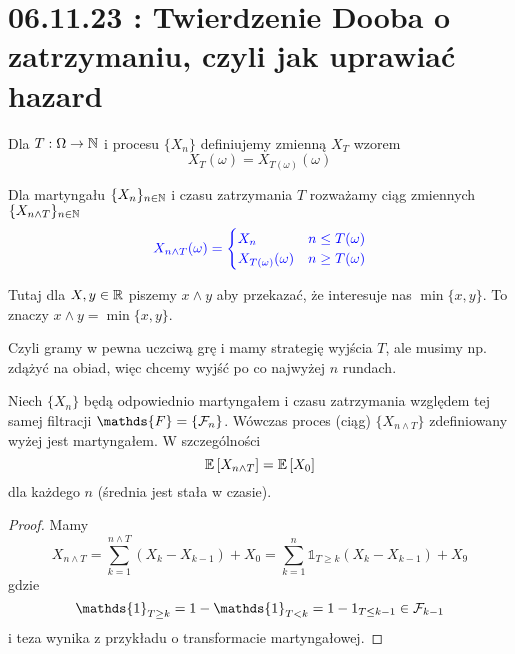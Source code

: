 \section{06.11.23 : Twierdzenie Dooba o zatrzymaniu, czyli jak uprawiać hazard}

  Dla $T:\Omega\to\operatorname{\mathbb{N}}$ i procesu $\{X_n\}$ definiujemy zmienną $X_T$ wzorem
  $$X_T(\omega)=X_{T(\omega)}(\omega)$$

  Dla martyngału $\{X_n\}_{n\in\operatorname{\mathbb{N}}}$ i czasu zatrzymania $T$ rozważamy ciąg zmiennych $\{X_{n\land T}\}_{n\in\operatorname{\mathbb{N}}}$
  $$\color{blue}X_{n\land T}(\omega)=\begin{cases}X_n& n\leq T(\omega)\\ X_{T(\omega)}(\omega) & n\geq T(\omega) \end{cases}$$

  Tutaj dla $X,y\in\operatorname{\mathbb{R}}$ piszemy $x\land y$ aby przekazać, że interesuje nas $\min\{x,y\}$. To znaczy $x\land y=\min\{x,y\}$.

Czyli gramy w pewna uczciwą grę i mamy strategię wyjścia $T$, ale musimy np. zdążyć na obiad, więc chcemy wyjść po co najwyżej $n$ rundach.

\begin{theorem}
  Niech $\{X_n\}$ będą odpowiednio martyngałem i czasu zatrzymania względem tej samej filtracji $\mathds{F}=\{\set{F}_n\}$. Wówczas proces (ciąg) $\{X_{n\land T}\}$ zdefiniowany wyżej jest martyngałem. W szczególności
  $$\expected{X_{n\land T}}=\expected{X_0}$$
  dla każdego $n$ (średnia jest stała w czasie).
\end{theorem}

\begin{proof}
  Mamy 
  $$X_{n\land T}=\sum_{k=1}^{n\land T}(X_k-X_{k-1})+X_0=\sum_{k=1}^n\mathds{1}_{T\geq k}(X_k-X_{k-1})+X_9$$
  gdzie
  $$\mathds{1}_{T\geq k}=1-\mathds{1}_{T<k}=1-1_{T\leq k-1}\in \set{F}_{k-1}$$
  i teza wynika z przykładu o transformacie martyngałowej.
\end{proof}

